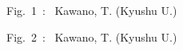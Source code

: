 \documentclass[12pt]{article}
\begin{document}
\pagestyle{empty}

%
%
\begin{flushright} Fig.~1~:~ Kawano, T. (Kyushu U.) \end{flushright}
\vskip1cm
  \begin{center}
  \end{center}
\clearpage

%
%
\begin{flushright} Fig.~2~:~ Kawano, T. (Kyushu U.) \end{flushright}
\vskip1cm
  \begin{center}
  \end{center}
\clearpage
\end{document}
